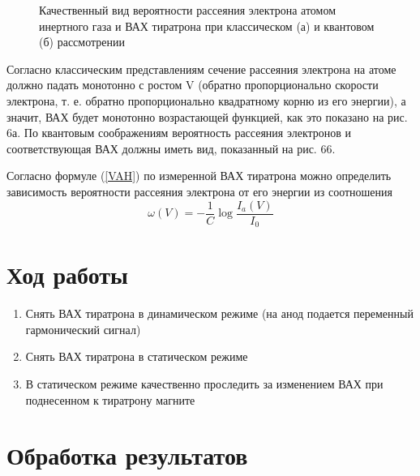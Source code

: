 \documentclass[12pt,a4paper]{article}
\begin{document}
\begin{figure}[ht!]\label{omega} 
\caption{Качественный вид вероятности рассеяния электрона атомом инертного газа и ВАХ тиратрона при классическом (а) и квантовом (б) рассмотрении}
\end{figure}

Согласно классическим представлениям сечение рассеяния электро­на на атоме должно падать монотонно с ростом V (обратно пропорционально скорости электрона, т. е. обратно пропорционально квадратному корню из его энергии), а значит, ВАХ будет монотонно возрастающей функцией, как это показано на рис. 6а. По квантовым соображениям ве­роятность рассеяния электронов и соответствующая ВАХ должны иметь вид, показанный на рис. 66.

Согласно формуле (\ref{VAH}) по измеренной ВАХ тиратрона можно определить зависимость вероятности рассеяния электрона от его энергии из соотношения
\begin{equation}
\omega(V) = -\frac{1}{C} \log\frac{I_a(V)}{I_0}
\end{equation}

\section{Ход работы}
\begin{enumerate}
\item Снять ВАХ тиратрона в динамическом режиме (на анод подается переменный гармонический сигнал)
\item Снять ВАХ тиратрона в статическом режиме
\item В статическом режиме качественно проследить за изменением ВАХ при поднесенном к тиратрону магните
\end{enumerate}

\section{Обработка результатов}
\end{document}

